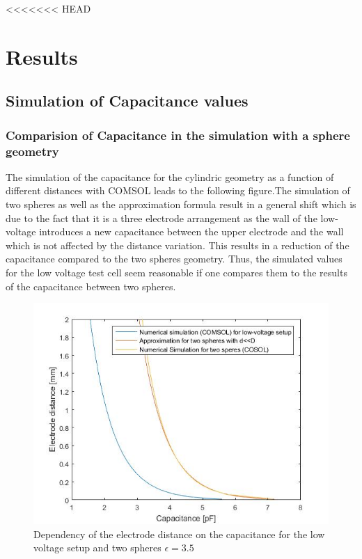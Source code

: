 <<<<<<< HEAD
\chapter{Results}
\section{Simulation of Capacitance values}
\subsection{Comparision of Capacitance in the simulation with a sphere geometry}
The simulation of the capacitance for the cylindric geometry as a function of different distances with COMSOL leads to the following figure.The simulation of two spheres as well as the approximation formula result in a general shift which is due to the fact that it is a three electrode arrangement as the wall of the low-voltage introduces a new capacitance between the upper electrode and the wall which is not affected by the distance variation. This results in a reduction of the capacitance compared to the two spheres geometry. Thus, the simulated values for the low voltage test cell seem reasonable if one compares them to the results of the capacitance between two spheres. \newline 


\begin{figure}[]
	\centering
	\includegraphics[scale=0.3]{figures/Comparison_Low_voltage_Two_spheres}		
	\caption[Kurze Abbildungsbeschreibung]{Dependency of the electrode distance on the capacitance for the low voltage setup and two spheres $\epsilon = 3.5$ } 
	\label{fig.waveforms}
\end{figure}

